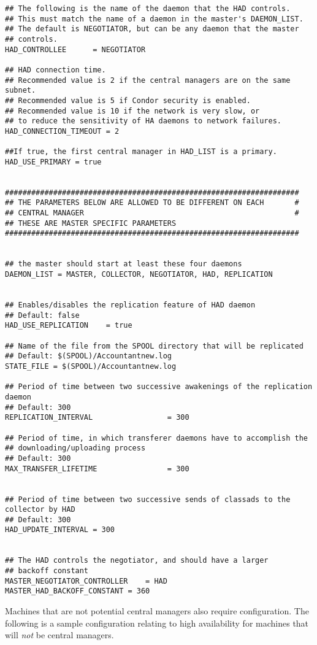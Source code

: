 \begin{verbatim}
## The following is the name of the daemon that the HAD controls.
## This must match the name of a daemon in the master's DAEMON_LIST.
## The default is NEGOTIATOR, but can be any daemon that the master
## controls.
HAD_CONTROLLEE		= NEGOTIATOR

## HAD connection time.
## Recommended value is 2 if the central managers are on the same subnet.
## Recommended value is 5 if Condor security is enabled.
## Recommended value is 10 if the network is very slow, or
## to reduce the sensitivity of HA daemons to network failures.
HAD_CONNECTION_TIMEOUT = 2

##If true, the first central manager in HAD_LIST is a primary.
HAD_USE_PRIMARY = true


###################################################################
## THE PARAMETERS BELOW ARE ALLOWED TO BE DIFFERENT ON EACH       #
## CENTRAL MANAGER                                                #
## THESE ARE MASTER SPECIFIC PARAMETERS
###################################################################


## the master should start at least these four daemons
DAEMON_LIST = MASTER, COLLECTOR, NEGOTIATOR, HAD, REPLICATION


## Enables/disables the replication feature of HAD daemon
## Default: false
HAD_USE_REPLICATION    = true

## Name of the file from the SPOOL directory that will be replicated
## Default: $(SPOOL)/Accountantnew.log
STATE_FILE = $(SPOOL)/Accountantnew.log

## Period of time between two successive awakenings of the replication daemon
## Default: 300
REPLICATION_INTERVAL                 = 300

## Period of time, in which transferer daemons have to accomplish the 
## downloading/uploading process
## Default: 300
MAX_TRANSFER_LIFETIME                = 300


## Period of time between two successive sends of classads to the collector by HAD
## Default: 300
HAD_UPDATE_INTERVAL = 300


## The HAD controls the negotiator, and should have a larger
## backoff constant
MASTER_NEGOTIATOR_CONTROLLER	= HAD
MASTER_HAD_BACKOFF_CONSTANT	= 360
\end{verbatim}
\normalsize

Machines that are not potential central managers also 
require configuration.
The following is a sample configuration relating to
high availability for machines that will \emph{not} be central managers.

